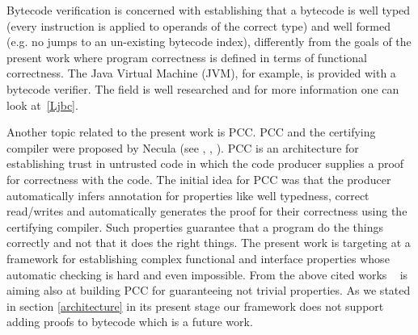  Bytecode verification is concerned with establishing that a bytecode is well typed 
(every instruction is applied to operands of the correct type) and well formed 
(e.g. no jumps to an un-existing bytecode index), differently from the goals of the present
work where program correctness is defined in terms of functional correctness. The Java Virtual Machine (JVM), for example, is provided with a bytecode verifier. 
The field is well researched and for more information one can look at~\ref{Ljbc}.  

Another topic related to the present work is PCC.
 PCC and the certifying compiler were proposed by Necula (see \cite{Necula97}, \cite{ComNec}, \cite{DesNecLee98}). PCC is an architecture for establishing trust in untrusted code 
in which the code producer supplies a proof for correctness with the code. 
The initial idea for PCC  was that the producer automatically infers annotation for properties like well typedness, 
correct read/writes and automatically generates the proof for their correctness using the certifying compiler. 
Such properties guarantee that a program do the things correctly and not that it does the right things. The present work is targeting at a
 framework for establishing complex functional and interface properties whose automatic checking is hard and even impossible. 
 From the above cited works ~\cite{BM05plb} is aiming also at building PCC for
 guaranteeing not trivial properties. As we stated in section \ref{architecture} in its present stage our framework does not support adding proofs to bytecode 
 which is a future work. 
 
